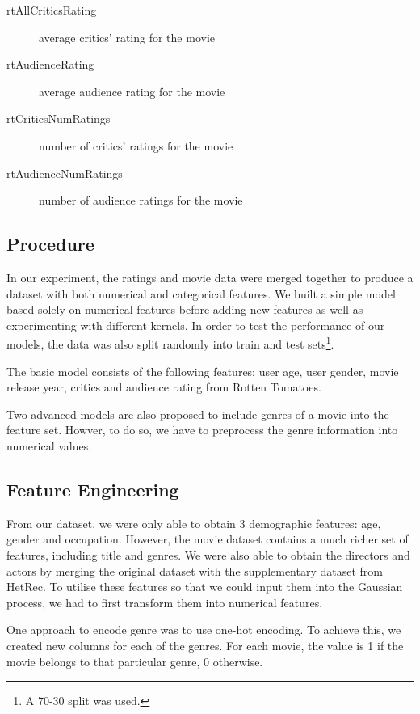 \documentclass[letterpaper]{article}
\begin{document}
\begin{description}
	\item[rtAllCriticsRating] average critics' rating for the movie
	\item[rtAudienceRating] average audience rating for the movie
	\item[rtCriticsNumRatings] number of critics' ratings for the movie
	\item[rtAudienceNumRatings] number of audience ratings for the movie
\end{description}

\subsection{Procedure}

In our experiment, the ratings and movie data were merged together to produce a dataset with both numerical and categorical features. We built a simple model based solely on numerical features before adding new features as well as experimenting with different kernels. In order to test the performance of our models, the data was also split randomly into train and test sets\footnote{A 70-30 split was used.}.

The basic model consists of the following features: user age, user gender, movie release year, critics and audience rating from Rotten Tomatoes.

Two advanced models are also proposed to include genres of a movie into the feature set. Howver, to do so, we have to preprocess the genre information into numerical values.

\subsection{Feature Engineering}
From our dataset, we were only able to obtain 3 demographic features: age, gender and occupation. However, the movie dataset contains a much richer set of features, including title and genres. We were also able to obtain the directors and actors by merging the original dataset with the supplementary dataset from HetRec. To utilise these features so that we could input them into the Gaussian process, we had to first transform them into numerical features.

One approach to encode genre was to use one-hot encoding. To achieve this, we created new columns for each of the genres. For each movie, the value is 1 if the movie belongs to that particular genre, 0 otherwise.
\end{document}
